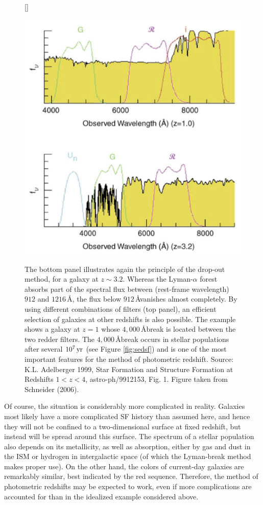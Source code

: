 \documentclass[a4paper,11pt]{article}
\begin{document}
\begin{figure}[h]
    [\FBwidth]
    {\caption{\footnotesize{The bottom panel illustrates again the principle of the drop-out method, for a galaxy at $z\sim3.2$. Whereas the Lyman-$\alpha$ forest absorbs part of the spectral flux between (rest-frame wavelength) $912$ and $1216$\,\AA, the flux below $912\,$\AA vanishes almost completely. By using different combinations of filters (top panel), an efficient selection of galaxies at other redshifts is also possible. The example shows a galaxy at $z=1$ whose $4,000\,$\AA break is located between the two redder filters. The $4,000\,$\AA break occurs in stellar populations after several $10^7\,{\rm yr}$ (see Figure \ref{fig:sedsf}) and is one of the most important features for the method of photometric redshift. Source: K.L. Adelberger 1999, Star Formation and Structure Formation at Redshifts $1<z<4$, astro-ph/9912153, Fig. 1. Figure taken from Schneider (2006).}}
    \label{fig:photredshifts}}
    {\includegraphics[width=12cm]{figures/PhotRedshifts.png}}
\end{figure}

{\noindent}Of course, the situation is considerably more complicated in reality. Galaxies most likely have a more complicated SF history than assumed here, and hence they will not be confined to a two-dimensional surface at fixed redshift, but instead will be spread around this surface. The spectrum of a stellar population also depends on its metallicity, as well as absorption, either by gas and dust in the ISM or hydrogen in intergalactic space (of which the Lyman-break method makes proper use). On the other hand, the colors of current-day galaxies are remarkably similar, best indicated by the red sequence. Therefore, the method of photometric redshifts may be expected to work, even if more complications are accounted for than in the idealized example considered above.
\end{document}
